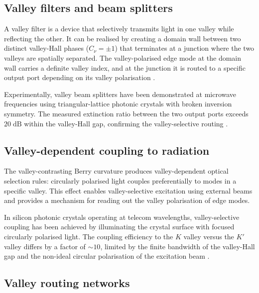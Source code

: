 \subsection{Valley filters and beam splitters}
\label{sec:ch12-valley-filter}

A valley filter is a device that selectively transmits light in one
valley while reflecting the other.  It can be realised by creating
a domain wall between two distinct valley-Hall phases ($C_\nu=\pm 1$)
that terminates at a junction where the two valleys are spatially
separated.  The valley-polarised edge mode at the domain wall
carries a definite valley index, and at the junction it is routed
to a specific output port depending on its valley polarisation
\cite{dong2016valley,gao2017valley}.

Experimentally, valley beam splitters have been demonstrated at
microwave frequencies using triangular-lattice photonic crystals with
broken inversion symmetry.  The measured extinction ratio between the
two output ports exceeds $20\;\mathrm{dB}$ within the valley-Hall
gap, confirming the valley-selective routing
\cite{gao2017topologically,he2019silicon}.

\subsection{Valley-dependent coupling to radiation}
\label{sec:ch12-valley-coupling}

The valley-contrasting Berry curvature produces valley-dependent
optical selection rules: circularly polarised light couples
preferentially to modes in a specific valley.  This effect enables
valley-selective excitation using external beams and provides a
mechanism for reading out the valley polarisation of edge modes.

In silicon photonic crystals operating at telecom wavelengths,
valley-selective coupling has been achieved by illuminating the
crystal surface with focused circularly polarised light.  The
coupling efficiency to the $K$ valley versus the $K'$ valley differs
by a factor of $\sim 10$, limited by the finite bandwidth of the
valley-Hall gap and the non-ideal circular polarisation of the
excitation beam \cite{he2016photonic,dong2016valley}.

\subsection{Valley routing networks}
\label{sec:ch12-valley-network}

